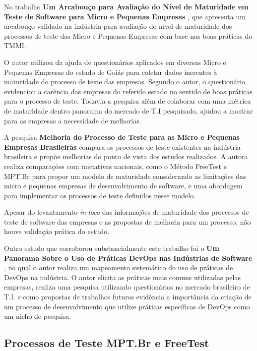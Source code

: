 No trabalho \textbf{Um Arcabouço para Avaliação do Nível de Maturidade em Teste de Software para Micro e Pequenas Empresas} \cite{Araujo2013}, que apresenta um arcabouço validado na indústria para avaliação do nível de maturidade dos processos de teste das Micro e Pequenas Empresas com base nas boas práticas do TMMI. 

O autor utilizou da ajuda de questionários aplicados em diversas Micro e Pequenas Empresas do estado de Goiás para coletar dados inerentes à maturidade do processo de teste das empresas. Segundo o autor, o questionário evidenciou a carência das empresas do referido estado no sentido de boas práticas para o processo de teste. Todavia a pesquisa além de colaborar com uma métrica de maturidade dentro panorama do mercado de T.I pesquisado, ajudou a mostrar para as empresas a necessidade de melhorias.

A pesquisa \textbf{Melhoria do Processo de Teste para as Micro e Pequenas Empresas Brasileiras} \cite{SilvaDias2015} compara os processos de teste existentes na indústria brasileira e propõe melhorias do ponto de vista dos estudos realizados. 
A autora realiza comparações com iniciativas nacionais, como o Método FreeTest e MPT.Br para propor um modelo de maturidade considerando as limitações das micro e pequenas empresas de desenvolvimento de software, e uma abordagem para implementar os processos de teste definidos nesse modelo.

Apesar do levantamento \textit{in-loco} das informações de maturidade dos processos de teste de software das empresas e as propostas de melhoria para um processo, não houve validação prática do estudo. 

Outro estudo que corroborou substancialmente este trabalho foi o \textbf{Um Panorama Sobre o Uso de Práticas DevOps nas Indústrias de Software} \cite{BRAGA2015}, no qual o autor realiza um mapeamento sistemático do uso de práticas de DevOps na indústria. O autor elicita as práticas mais comuns utilizadas pelas empresas, realiza uma pesquisa utilizando questionários no mercado brasileiro de T.I. e como propostas de trabalhos futuros evidência a importância da criação de um processo de desenvolvimento que utilize práticas específicas de DevOps como um nicho de pesquisa.

\subsection{Processos de Teste MPT.Br e FreeTest}
\label{processosteste}

